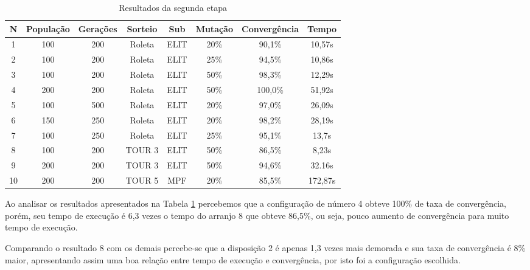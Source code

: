 \documentclass[a4paper, 12pt]{article}
\begin{document}
  \begin{table}[h]
    \centering
    \begin{tabular}{|c|c|c|c|c|c|c|c|}
      \hline
      N & População & Gerações & Sorteio & Sub & Mutação & Convergência & Tempo \\
      \hline
      1 & 100 & 200 & Roleta & ELIT & 20\% & 90,1\% & 10,57s \\
      \hline
      2 & 100 & 200 & Roleta & ELIT & 25\% & 94,5\% & 10,86s \\
      \hline
      3 & 100 & 200 & Roleta & ELIT & 50\% & 98,3\% & 12,29s \\
      \hline
      4 & 200 & 200 & Roleta & ELIT & 50\% & 100,0\% & 51,92s \\
      \hline
      5 & 100 & 500 & Roleta & ELIT & 20\% & 97,0\% & 26,09s \\
      \hline
      6 & 150 & 250 & Roleta & ELIT & 20\% & 98,2\% & 28,19s \\
      \hline
      7 & 100 & 250 & Roleta & ELIT & 25\% & 95,1\% & 13,7s \\
      \hline
      8 & 100 & 200 & TOUR 3 & ELIT & 50\% & 86,5\% & 8,23s \\
      \hline
      9 & 200 & 200 & TOUR 3 & ELIT & 50\% & 94,6\% & 32.16s \\
      \hline
      10 & 200 & 200 & TOUR 5 & MPF & 20\% & 85,5\% & 172,87s \\
      \hline
    \end{tabular}
    \caption{Resultados da segunda etapa}
    \label{tab:etapa2}
  \end{table}

  Ao analisar os resultados apresentados na Tabela \ref{tab:etapa2} percebemos
  que a configuração de número 4 obteve 100\% de taxa de convergência, porém,
  seu tempo de execução é 6,3 vezes o tempo do arranjo 8 que obteve 86,5\%, ou seja,
  pouco aumento de convergência para muito tempo de execução.

  Comparando o resultado 8 com os demais percebe-se que a disposição 2 é apenas
  1,3 vezes mais demorada e sua taxa de convergência é 8\% maior, apresentando assim
  uma boa relação entre tempo de execução e convergência, por isto foi a configuração
  escolhida.
\end{document}
